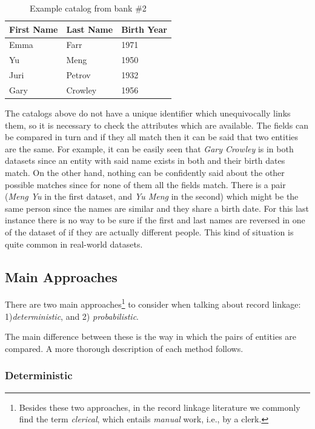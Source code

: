 \documentclass[epsfig,a4paper,11pt,titlepage,twoside,openany]{book}
\begin{document}
\begin{table}[H]
  \centering{}
  \begin{tabular}{l|l|l}
    First Name & Last Name  & Birth Year \\ \hline
    Emma       & Farr       & 1971       \\
    Yu         & Meng       & 1950       \\
    Juri       &  Petrov    & 1932 \\
    Gary       & Crowley    & 1956      
  \end{tabular}
  \caption{Example catalog from bank \#2}
  \label{tab:ex-catalog-2}
\end{table}

The catalogs above do not have a unique identifier which unequivocally links them, so it is necessary to check the attributes which are available. The fields can be compared in turn and if they all match then it can be said that two entities are the same. For example, it can be easily seen that \textit{Gary Crowley} is in both datasets since an entity with said name exists in both and their birth dates match. On the other hand, nothing can be confidently said about the other possible matches since for none of them all the fields match. There is a pair (\textit{Meng Yu} in the first dataset, and \textit{Yu Meng} in the second) which might be the same person since the names are similar and they share a birth date. For this last instance there is no way to be sure if the first and last names are reversed in one of the dataset of if they are actually different people. This kind of situation is quite common in real-world datasets.





\subsection{Main Approaches}
\label{sec:rl-main-approaches}

There are two main approaches\footnote{Besides these two approaches, in the record linkage literature we commonly find the term \textit{clerical}, which entails \textit{manual} work, i.e., by a clerk.} to consider when talking about record linkage: 1)\textit{deterministic}, and 2) \textit{probabilistic}. 

The main difference between these is the way in which the pairs of entities are compared. A more thorough description of each method follows.


\subsubsection{Deterministic}
\label{sec:rl-approach-deterministic}
\end{document}
